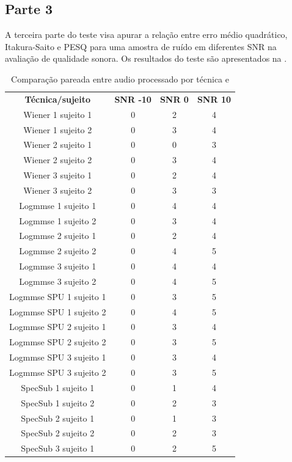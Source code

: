 \subsection{Parte 3}
A terceira parte do teste visa apurar a relação entre erro médio quadrático, Itakura-Saito e PESQ para uma amostra de ruído em diferentes SNR na avaliação de qualidade sonora. Os resultados do teste são apresentados na .
\begin{table}[H]
\centering
\caption{Comparação pareada entre audio processado por técnica e }
\label{tab3}
\begin{tabular}{cccc}
\textbf{Técnica/sujeito} & \textbf{SNR -10} & \textbf{SNR 0} & \textbf{SNR 10} \\
Wiener 1 sujeito        1 & 0 & 2 & 4 \\
Wiener 1 sujeito        2 & 0 & 3 & 4 \\
Wiener 2 sujeito        1 & 0 & 0 & 3 \\
Wiener 2 sujeito        2 & 0 & 3 & 4 \\
Wiener 3 sujeito        1 & 0 & 2 & 4 \\
Wiener 3 sujeito        2 & 0 & 3 & 3 \\
Logmmse 1 sujeito       1 & 0 & 4 & 4 \\
Logmmse 1 sujeito       2 & 0 & 3 & 4 \\
Logmmse 2 sujeito       1 & 0 & 2 & 4 \\
Logmmse 2 sujeito       2 & 0 & 4 & 5 \\
Logmmse 3 sujeito       1 & 0 & 4 & 4 \\
Logmmse 3 sujeito       2 & 0 & 4 & 5 \\
Logmmse SPU 1 sujeito   1 & 0 & 3 & 5 \\
Logmmse SPU 1 sujeito   2 & 0 & 4 & 5 \\
Logmmse SPU 2 sujeito   1 & 0 & 3 & 4 \\
Logmmse SPU 2 sujeito   2 & 0 & 3 & 5 \\
Logmmse SPU 3 sujeito   1 & 0 & 3 & 4 \\
Logmmse SPU 3 sujeito   2 & 0 & 3 & 5 \\
SpecSub 1 sujeito       1 & 0 & 1 & 4 \\
SpecSub 1 sujeito       2 & 0 & 2 & 3 \\
SpecSub 2 sujeito       1 & 0 & 1 & 3 \\
SpecSub 2 sujeito       2 & 0 & 2 & 3 \\
SpecSub 3 sujeito       1 & 0 & 2 & 5 \\

\end{tabular}
\end{table}
